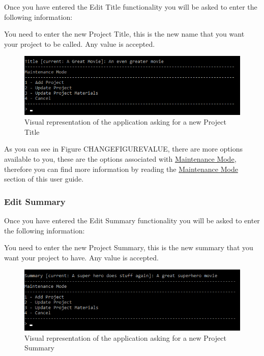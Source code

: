 \documentclass[
  english,
  a4paper,
,tablecaptionabove
]{scrartcl}
\begin{document}
Once you have entered the Edit Title functionality you will be asked to
enter the following information:

You need to enter the new Project Title, this is the new name that you
want your project to be called. Any value is accepted.

\begin{figure}
\centering
\includegraphics{images/user-guide/maintenance-mode/update-project-title.png}
\caption{Visual representation of the application asking for a new
Project Title}
\end{figure}

As you can see in Figure CHANGEFIGUREVALUE, there are more options
available to you, these are the options associated with
\protect\hyperlink{using-maintenance-mode}{Maintenance Mode}, therefore
you can find more information by reading the
\protect\hyperlink{using-maintenance-mode}{Maintenance Mode} section of
this user guide.

\newpage

\hypertarget{edit-summary-1}{%
\subsubsection{Edit Summary}\label{edit-summary-1}}

Once you have entered the Edit Summary functionality you will be asked
to enter the following information:

You need to enter the new Project Summary, this is the new summary that
you want your project to have. Any value is accepted.

\begin{figure}
\centering
\includegraphics{images/user-guide/maintenance-mode/update-project-summary.png}
\caption{Visual representation of the application asking for a new
Project Summary}
\end{figure}
\end{document}
